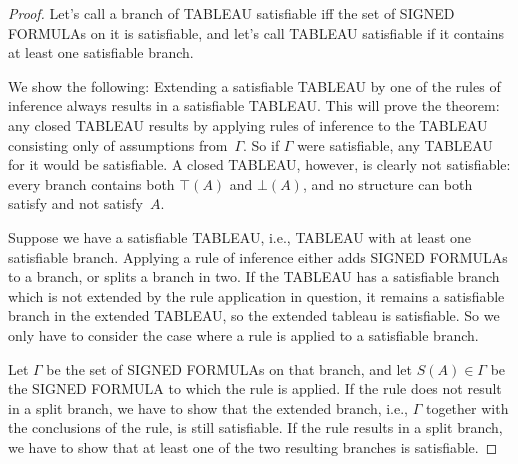 \documentclass[10pt,a4paper]{article}
\newcommand*{\olup}[1]{\MakeUppercase{#1}}
\theoremstyle{plain}
\theoremstyle{definition}
\theoremstyle{remark}
\providecommand{\sFmla}[2]{#1(#2)}
\providecommand{\True}{\top}
\providecommand{\False}{\bot}
\begin{document}
\begin{proof}
Let's call a branch of \olup{tableau} satisfiable iff the set of
\olup{signed formula}s on it is satisfiable, and let's call \olup{tableau}
satisfiable if it contains at least one satisfiable branch.

We show the following: Extending a satisfiable \olup{tableau} by one of
the rules of inference always results in a satisfiable \olup{tableau}.
This will prove the theorem: any closed \olup{tableau} results by
applying rules of inference to the \olup{tableau} consisting only of
assumptions from~$\Gamma$. So if $\Gamma$ were satisfiable, any
\olup{tableau} for it would be satisfiable. A closed \olup{tableau},
however, is clearly not satisfiable: every branch contains both
$\sFmla{\True}{A}$ and $\sFmla{\False}{A}$, and no structure can
both satisfy and not satisfy~$A$.

Suppose we have a satisfiable \olup{tableau}, i.e., \olup{tableau} with at
least one satisfiable branch. Applying a rule of inference either adds
\olup{signed formula}s to a branch, or splits a branch in two. If the
\olup{tableau} has a satisfiable branch which is not extended by the rule
application in question, it remains a satisfiable branch in the
extended \olup{tableau}, so the extended tableau is satisfiable. So we
only have to consider the case where a rule is applied to a
satisfiable branch.

Let $\Gamma$ be the set of \olup{signed formula}s on that branch, and
let $\sFmla{S}{A} \in \Gamma$ be the \olup{signed formula} to which the
rule is applied. If the rule does not result in a split branch, we
have to show that the extended branch, i.e., $\Gamma$ together with
the conclusions of the rule, is still satisfiable. If the rule results
in a split branch, we have to show that at least one of the two
resulting branches is satisfiable.
  

\end{proof}
\end{document}
